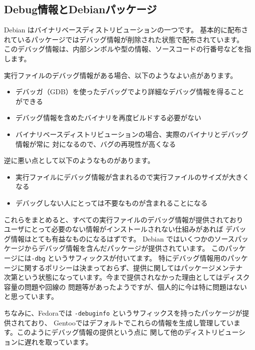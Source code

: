 \documentclass[mingoth,a4paper]{jsarticle}
\begin{document}
\subsection{Debug情報とDebianパッケージ}
Debian はバイナリベースディストリビューションの一つです。
基本的に配布されているパッケージではデバッグ情報が削除された状態で配布されています。
このデバッグ情報は、内部シンボルや型の情報、ソースコードの行番号などを指します。

実行ファイルのデバッグ情報がある場合、以下のようなよい点があります。
\begin{itemize}
\item デバッガ（GDB）を使ったデバッグでより詳細なデバッグ情報を得ること
ができる
\item デバッグ情報を含めたバイナリを再度ビルドする必要がない
\item バイナリベースディストリビューションの場合、実際のバイナリとデバッグ情報が常に
対になるので、バグの再現性が高くなる
\end{itemize}

逆に悪い点として以下のようなものがあります。

\begin{itemize}
\item 実行ファイルにデバッグ情報が含まれるので実行ファイルのサイズが大きくなる
\item デバッグしない人にとっては不要なものが含まれることになる
\end{itemize}

これらをまとめると、すべての実行ファイルのデバッグ情報が提供されており
ユーザにとって必要のない情報がインストールされない仕組みがあれば
デバッグ情報はとても有益なものになるはずです。
Debian ではいくつかのソースパッケージからデバッグ情報を含んだパッケージが提供されています。
このパッケージには\texttt{-dbg} というサフィックスが付いてます。
特にデバッグ情報用のパッケージに関するポリシーは決まっておらず、提供に関してはパッケージメンテナ
次第という状態になっています。今まで提供されなかった理由としてはディスク容量の問題や回線の
問題等があったようですが、個人的に今は特に問題はないと思っています。

ちなみに、Fedoraでは \texttt{-debuginfo} というサフィックスを持ったパッケージが提供されており、
Gentooではデフォルトでこれらの情報を生成し管理しています。このようにデバッグ情報の提供という点に
関して他のディストリビューションに遅れを取っています。
\end{document}
